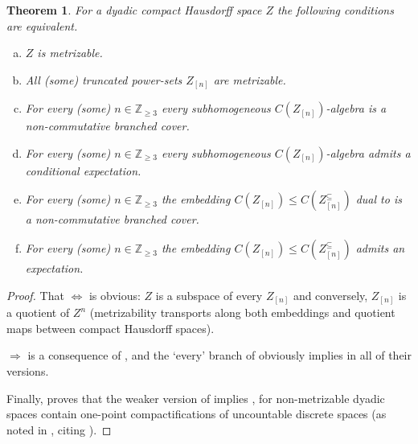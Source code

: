 \documentclass[11pt,leqno]{article}
\theoremstyle{plain}
\newtheorem{theorem}[lemma]{Theorem}
\theoremstyle{plain}
\theoremstyle{plain}
\numberwithin{equation}{section}
\theoremstyle{nonumberplain}
\newtheorem{proof}{Proof}
\newcommand\bZ{{\mathbb Z}}
\newcommand\1{{\bf 1}}
\begin{document}
\begin{theorem}\label{th:char.metr}
  For a dyadic compact Hausdorff space $Z$ the following conditions are equivalent.

  \begin{enumerate}[(a),wide]
  \item\label{item:th:char.metr:metr} $Z$ is metrizable.

  \item\label{item:th:char.metr:metr.sympow} All (some) truncated power-sets $Z_{[n]}$ are metrizable. 

  \item\label{item:th:char.metr:gen.br} For every (some) $n\in \bZ_{\ge 3}$ every subhomogeneous $C\left(Z_{[n]}\right)$-algebra is a non-commutative branched cover.

  \item\label{item:th:char.metr:gen.exp} For every (some) $n\in \bZ_{\ge 3}$ every subhomogeneous $C\left(Z_{[n]}\right)$-algebra admits a conditional expectation.

  \item\label{item:th:char.metr:part.br} For every (some) $n\in \bZ_{\ge 3}$ the embedding $C\left(Z_{[n]}\right)\le C\left(Z_{[n]}^{\subseteq}\right)$ dual to  is a non-commutative branched cover.

  \item\label{item:th:char.metr:part.exp} For every (some) $n\in \bZ_{\ge 3}$ the embedding $C\left(Z_{[n]}\right)\le C\left(Z_{[n]}^{\subseteq}\right)$ admits an expectation.
  \end{enumerate}
\end{theorem}
\begin{proof}
  That  $\Leftrightarrow$  is obvious: $Z$ is a subspace of every $Z_{[n]}$ and conversely, $Z_{[n]}$ is a quotient of $Z^n$ (metrizability transports along both embeddings and quotient maps between compact Hausdorff spaces).

   $\Rightarrow$  is a consequence of \cite[Theorem 2.12]{2409.03531v1}, and the `every' branch of  obviously implies  in all of their versions.

  Finally,  proves that the weaker version of  implies , for non-metrizable dyadic spaces contain one-point compactifications of uncountable discrete spaces (as noted in \cite[paragraph preceding Remark 2]{zbMATH03569401}, citing \cite[p.499, Proof of Theorem 4]{zbMATH03209749}).
\end{proof}
\end{document}
